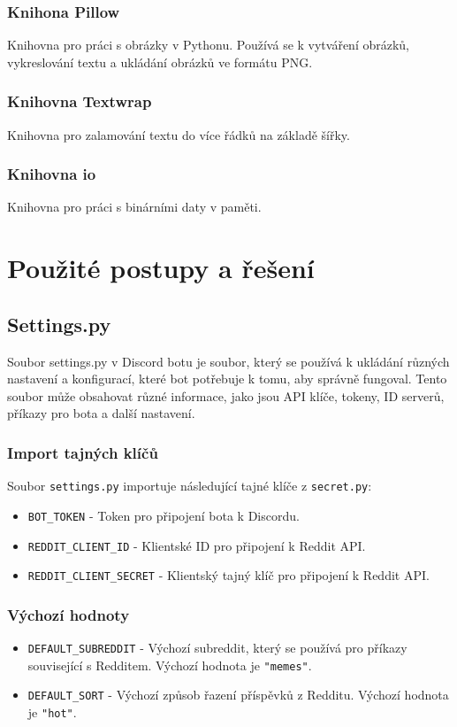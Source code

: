 \documentclass[12pt, a4paper]{report}
\begin{document}
\subsection{Knihona Pillow}
Knihovna pro práci s obrázky v Pythonu. Používá se k vytváření obrázků, vykreslování textu a ukládání obrázků ve formátu PNG.
\subsection{Knihovna Textwrap}
Knihovna pro zalamování textu do více řádků na základě šířky.
\subsection{Knihovna io}
Knihovna pro práci s binárními daty v paměti.

\chapter{Použité postupy a řešení}

\section{Settings.py}
Soubor settings.py v Discord botu je soubor, který se používá k ukládání různých nastavení a konfigurací, které bot potřebuje k tomu, aby správně fungoval. Tento soubor může obsahovat různé informace, jako jsou API klíče, tokeny, ID serverů, příkazy pro bota a další nastavení.
\subsection{Import tajných klíčů}
Soubor \texttt{settings.py} importuje následující tajné klíče z \texttt{secret.py}:

\begin{itemize}
    \item \texttt{BOT\_TOKEN} - Token pro připojení bota k Discordu.
    \item \texttt{REDDIT\_CLIENT\_ID} - Klientské ID pro připojení k Reddit API.
    \item \texttt{REDDIT\_CLIENT\_SECRET} - Klientský tajný klíč pro připojení k Reddit API.
\end{itemize}

\subsection{Výchozí hodnoty}

\begin{itemize}
    \item \texttt{DEFAULT\_SUBREDDIT} - Výchozí subreddit, který se používá pro příkazy související s Redditem. Výchozí hodnota je \texttt{"memes"}.
    \item \texttt{DEFAULT\_SORT} - Výchozí způsob řazení příspěvků z Redditu. Výchozí hodnota je \texttt{"hot"}.
\end{itemize}
\end{document}
